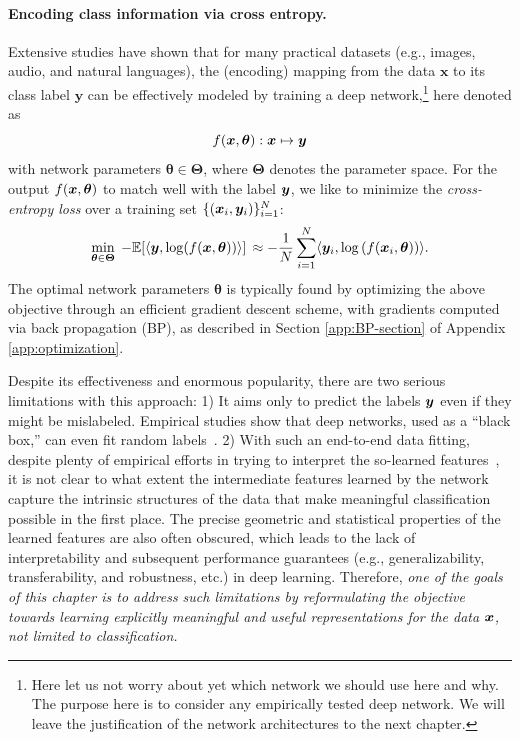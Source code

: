 \documentclass[../../book-main.tex]{subfiles}
\begin{document}
\paragraph{Encoding class information via cross entropy.}  Extensive studies have shown that for many practical datasets (e.g., images, audio, and natural languages), the (encoding) mapping from the data $\bm{x}$ to its class label $\bm{y}$ can be effectively modeled by training a deep network,\footnote{Here let us not worry about yet which network we should use here and why. The purpose here is to consider any empirically tested deep network. We will leave the justification of the network architectures to the next chapter.} here denoted as $$f(\bm{x}, \bm \theta):\bm{x} \mapsto \bm{y}$$ with network parameters $\bm \theta \in \bm \Theta$, where $\bm \Theta$ denotes the parameter space. For the output $f(\bm{x}, \bm \theta)$ to match well with the label $\bm{y}$, we like to  minimize the {\em cross-entropy loss} over a training set $\{(\bm{x}_i, \bm{y}_i)\}_{i=1}^N$: 
\begin{equation}
   \min_{\bm \theta \in \bm \Theta} \; - \mathbb{E}[\langle \bm{y}, \log(f(\bm{x}, \bm \theta)) \rangle] \, \approx - \frac{1}{N}\sum_{i=1}^N \langle \bm{y}_i, \log\left(f(\bm{x}_i, \bm \theta)\right) \rangle.
   \label{chap4-eqn:cross-entropy}
\end{equation}
The optimal network parameters $\bm \theta $ is typically found by optimizing the above objective through an efficient gradient descent scheme, with gradients computed via back propagation (BP), as described in Section \ref{app:BP-section} of Appendix \ref{app:optimization}.

Despite its effectiveness and enormous popularity, there are two serious limitations with this approach:  1) It aims only to predict the labels $\bm{y}$ even if they might be mislabeled. Empirical studies show that deep networks, used as a ``black box,'' can even fit random labels~\cite{zhang2017understanding}.
2) With such an end-to-end data fitting,
despite plenty of empirical efforts in trying to interpret the so-learned features~\cite{Zeiler-ECCV2014},
it is not clear to what extent the intermediate features learned by the network capture the intrinsic structures of the data that make meaningful classification possible in the first place. The precise geometric and statistical properties of the learned features are also often obscured, which leads to the lack of interpretability and subsequent performance guarantees (e.g., generalizability, transferability, and robustness, etc.) in deep learning.
Therefore, {\em one of the goals of this chapter is to address such limitations by reformulating the objective towards learning explicitly meaningful and useful representations for the data $\bm{x}$, not limited to classification.}
\end{document}
